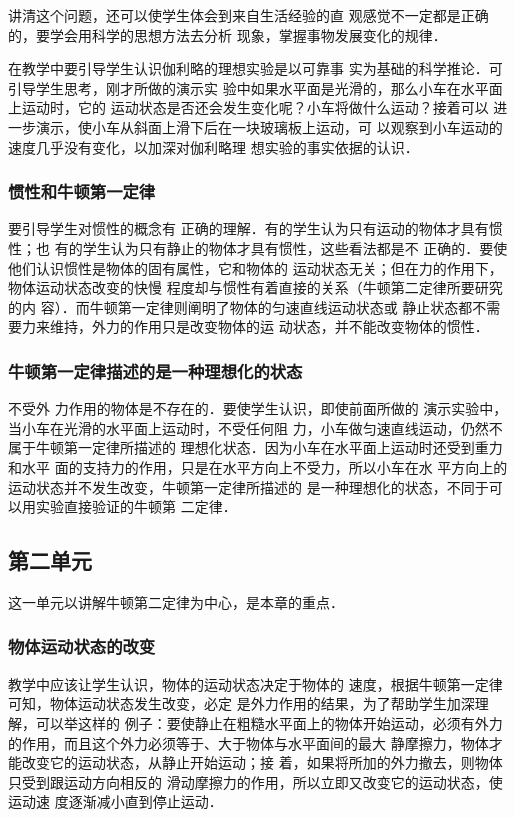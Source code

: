 讲清这个问题，还可以使学生体会到来自生活经验的直
观感觉不一定都是正确的，要学会用科学的思想方法去分析
现象，掌握事物发展变化的规律．

在教学中要引导学生认识伽利略的理想实验是以可靠事
实为基础的科学推论．可引导学生思考，刚才所做的演示实
验中如果水平面是光滑的，那么小车在水平面上运动时，它的
运动状态是否还会发生变化呢？小车将做什么运动？接着可以
进一步演示，使小车从斜面上滑下后在一块玻璃板上运动，可
以观察到小车运动的速度几乎没有变化，以加深对伽利略理
想实验的事实依据的认识．

\subsubsection{惯性和牛顿第一定律}

要引导学生对惯性的概念有
正确的理解．有的学生认为只有运动的物体才具有惯性；也
有的学生认为只有静止的物体才具有惯性，这些看法都是不
正确的．要使他们认识惯性是物体的固有属性，它和物体的
运动状态无关；但在力的作用下，物体运动状态改变的快慢
程度却与惯性有着直接的关系（牛顿第二定律所要研究的内
容）．而牛顿第一定律则阐明了物体的匀速直线运动状态或
静止状态都不需要力来维持，外力的作用只是改变物体的运
动状态，并不能改变物体的惯性．

\subsubsection{牛顿第一定律描述的是一种理想化的状态}

不受外
力作用的物体是不存在的．要使学生认识，即使前面所做的
演示实验中，当小车在光滑的水平面上运动时，不受任何阻
力，小车做匀速直线运动，仍然不属于牛顿第一定律所描述的
理想化状态．因为小车在水平面上运动时还受到重力和水平
面的支持力的作用，只是在水平方向上不受力，所以小车在水
平方向上的运动状态并不发生改变，牛顿第一定律所描述的
是一种理想化的状态，不同于可以用实验直接验证的牛顿第
二定律．

\subsection{第二单元}
这一单元以讲解牛顿第二定律为中心，是本章的重点．
\subsubsection{物体运动状态的改变}
教学中应该让学生认识，物体的运动状态决定于物体的
速度，根据牛顿第一定律可知，物体运动状态发生改变，必定
是外力作用的结果，为了帮助学生加深理解，可以举这样的
例子：要使静止在粗糙水平面上的物体开始运动，必须有外力
的作用，而且这个外力必须等于、大于物体与水平面间的最大
静摩擦力，物体才能改变它的运动状态，从静止开始运动；接
着，如果将所加的外力撤去，则物体只受到跟运动方向相反的
滑动摩擦力的作用，所以立即又改变它的运动状态，使运动速
度逐渐减小直到停止运动．


